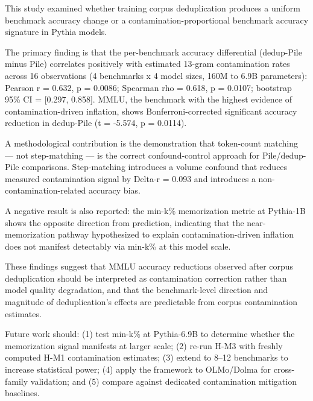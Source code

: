 
This study examined whether training corpus deduplication produces a uniform benchmark accuracy change or a contamination-proportional benchmark accuracy signature in Pythia models.

The primary finding is that the per-benchmark accuracy differential (dedup-Pile minus Pile) correlates positively with estimated 13-gram contamination rates across 16 observations (4 benchmarks x 4 model sizes, 160M to 6.9B parameters): Pearson r = 0.632, p = 0.0086; Spearman rho = 0.618, p = 0.0107; bootstrap 95\% CI = [0.297, 0.858]. MMLU, the benchmark with the highest evidence of contamination-driven inflation, shows Bonferroni-corrected significant accuracy reduction in dedup-Pile (t = -5.574, p = 0.0114).

A methodological contribution is the demonstration that token-count matching --- not step-matching --- is the correct confound-control approach for Pile/dedup-Pile comparisons. Step-matching introduces a volume confound that reduces measured contamination signal by Delta-r = 0.093 and introduces a non-contamination-related accuracy bias.

A negative result is also reported: the min-k\% memorization metric at Pythia-1B shows the opposite direction from prediction, indicating that the near-memorization pathway hypothesized to explain contamination-driven inflation does not manifest detectably via min-k\% at this model scale.

These findings suggest that MMLU accuracy reductions observed after corpus deduplication should be interpreted as contamination correction rather than model quality degradation, and that the benchmark-level direction and magnitude of deduplication's effects are predictable from corpus contamination estimates.

Future work should: (1) test min-k\% at Pythia-6.9B to determine whether the memorization signal manifests at larger scale; (2) re-run H-M3 with freshly computed H-M1 contamination estimates; (3) extend to 8--12 benchmarks to increase statistical power; (4) apply the framework to OLMo/Dolma for cross-family validation; and (5) compare against dedicated contamination mitigation baselines.

